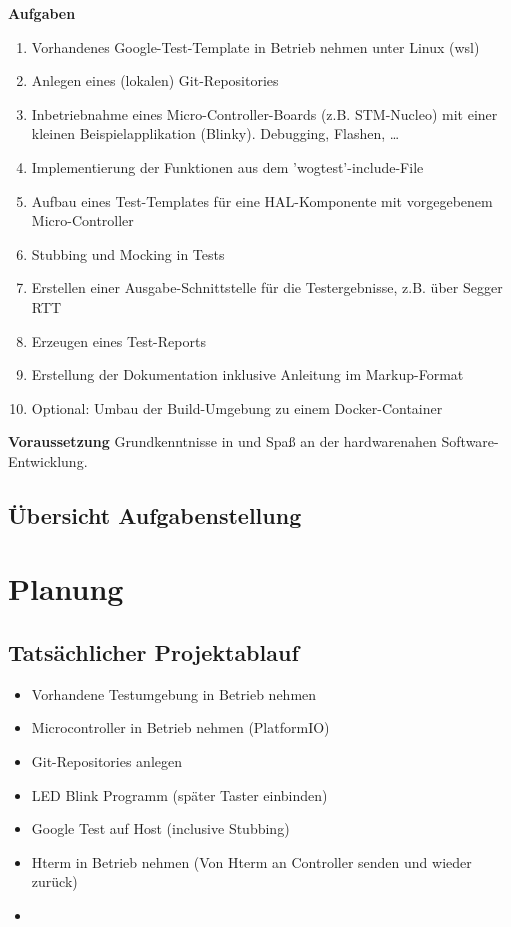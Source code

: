 \documentclass[12pt,a4paper]{article}
\begin{document}
\textbf{Aufgaben}
\begin{enumerate}
  \item Vorhandenes Google-Test-Template in Betrieb nehmen unter Linux (wsl)
  \item Anlegen eines (lokalen) Git-Repositories
  \item Inbetriebnahme eines Micro-Controller-Boards (z.B. STM-Nucleo) mit einer kleinen Beispielapplikation (Blinky). Debugging, Flashen, …
  \item Implementierung der Funktionen aus dem 'wogtest'-include-File
  \item Aufbau eines Test-Templates für eine HAL-Komponente mit vorgegebenem Micro-Controller
  \item Stubbing und Mocking in Tests
  \item Erstellen einer Ausgabe-Schnittstelle für die Testergebnisse, z.B. über Segger RTT
  \item Erzeugen eines Test-Reports
  \item Erstellung der Dokumentation inklusive Anleitung im Markup-Format
  \item Optional: Umbau der Build-Umgebung zu einem Docker-Container\newline
\end{enumerate}
\textbf{Voraussetzung}
\newline
Grundkenntnisse in und Spaß an der hardwarenahen Software-Entwicklung.

\subsection{Übersicht Aufgabenstellung}

\empty

\newpage
\section{Planung}
\subsection{Tatsächlicher Projektablauf}
\begin{itemize}
  \item Vorhandene Testumgebung in Betrieb nehmen
  \item Microcontroller in Betrieb nehmen (PlatformIO)
  \item Git-Repositories anlegen
  \item LED Blink Programm (später Taster einbinden)
  \item Google Test auf Host (inclusive Stubbing)
  \item Hterm in Betrieb nehmen (Von Hterm an Controller senden und wieder zurück)
  \item 

\end{itemize}
\end{document}
